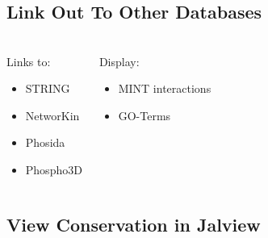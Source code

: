 \documentclass[a4paper,10pt,xcolor=pdftex,dvipsnames,table]{beamer}
\begin{document}
\subsection{Link Out To Other Databases}
\begin{frame}[t]\frametitle{\insertsubsection}
    \phosphoelmlogo
    \note{~}
        \begin{columns}
            \begin{exampleblock}{Links to:}
                \begin{itemize}
                    \item STRING
                    \item NetworKin
                    \item Phosida
                    \item Phospho3D
                \end{itemize}
            \end{exampleblock}
            \begin{exampleblock}{Display:}
                \begin{itemize}
                    \item MINT interactions
                    \item GO-Terms
                \end{itemize}
            \end{exampleblock}
        \\ 
        \end{columns}
\end{frame}

\subsection{View Conservation in Jalview}
\begin{frame}[t]\frametitle{\insertsubsection}
    \phosphoelmlogo
    \note{~}
    \begin{center}
    \end{center}
\end{frame}
\end{document}
